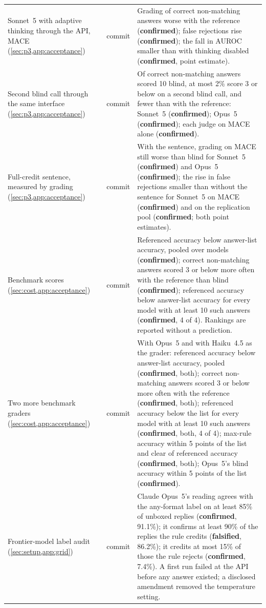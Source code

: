 {\begin{longtable}{L{3.2cm}L{1.1cm}L{8.7cm}}
Sonnet~5 with adaptive thinking through the API, \textsc{MACE} (\cref{sec:p3,app:acceptance}) & commit & Grading of correct non-matching answers worse with the reference (\textbf{confirmed}); false rejections rise (\textbf{confirmed}); the fall in AUROC smaller than with thinking disabled (\textbf{confirmed}, point estimate). \\
Second blind call through the same interface (\cref{sec:p3,app:acceptance}) & commit & Of correct non-matching answers scored 10 blind, at most 2\% score 3 or below on a second blind call, and fewer than with the reference: Sonnet~5 (\textbf{confirmed}); Opus~5 (\textbf{confirmed}); each judge on \textsc{MACE} alone (\textbf{confirmed}). \\
Full-credit sentence, measured by grading (\cref{sec:p3,app:acceptance}) & commit & With the sentence, grading on \textsc{MACE} still worse than blind for Sonnet~5 (\textbf{confirmed}) and Opus~5 (\textbf{confirmed}); the rise in false rejections smaller than without the sentence for Sonnet~5 on \textsc{MACE} (\textbf{confirmed}) and on the replication pool (\textbf{confirmed}; both point estimates). \\
Benchmark scores (\cref{sec:cost,app:acceptance}) & commit & Referenced accuracy below answer-list accuracy, pooled over models (\textbf{confirmed}); correct non-matching answers scored 3 or below more often with the reference than blind (\textbf{confirmed}); referenced accuracy below answer-list accuracy for every model with at least 10 such answers (\textbf{confirmed}, 4 of 4). Rankings are reported without a prediction. \\
Two more benchmark graders (\cref{sec:cost,app:acceptance}) & commit & With Opus~5 and with Haiku~4.5 as the grader: referenced accuracy below answer-list accuracy, pooled (\textbf{confirmed}, both); correct non-matching answers scored 3 or below more often with the reference (\textbf{confirmed}, both); referenced accuracy below the list for every model with at least 10 such answers (\textbf{confirmed}, both, 4 of 4); max-rule accuracy within 5 points of the list and clear of referenced accuracy (\textbf{confirmed}, both); Opus~5's blind accuracy within 5 points of the list (\textbf{confirmed}). \\
Frontier-model label audit (\cref{sec:setup,app:grid}) & commit & Claude Opus~5's reading agrees with the any-format label on at least 85\% of unboxed replies (\textbf{confirmed}, 91.1\%); it confirms at least 90\% of the replies the rule credits (\textbf{falsified}, 86.2\%); it credits at most 15\% of those the rule rejects (\textbf{confirmed}, 7.4\%). A first run failed at the API before any answer existed; a disclosed amendment removed the temperature setting. \\

\end{longtable}}
